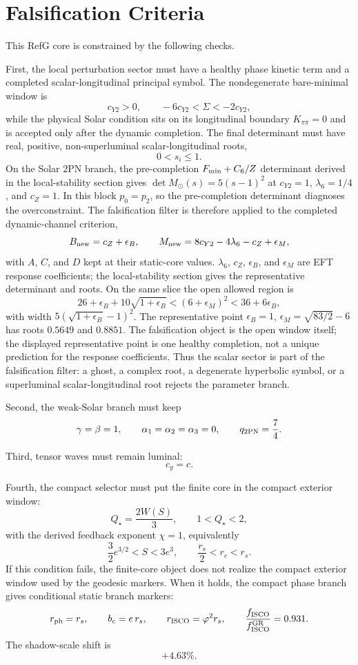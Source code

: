 \documentclass[12pt,a4paper]{article}
\begin{document}
\section{Falsification Criteria}

This RefG core is constrained by the following checks.

First, the local perturbation sector must have a healthy phase kinetic term and
a completed scalar-longitudinal principal symbol. The nondegenerate
bare-minimal window is
\[
c_{Y2}>0,\qquad -6c_{Y2}<\Sigma<-2c_{Y2},
\]
while the physical Solar condition sits on its longitudinal boundary
$K_{\pi\pi}=0$ and is accepted only after the dynamic completion. The final
determinant must have real, positive, non-superluminal scalar-longitudinal
roots,
\[
0<s_i\le 1.
\]
On the Solar $2$PN branch, the pre-completion $F_{\rm min}+C_6/Z$ determinant
derived in the local-stability section gives
$\det M_\odot(s)=5(s-1)^2$ at
$c_{Y2}=1$, $\lambda_6=1/4$, and $c_Z=1$. In this block $p_0=p_2$, so the
pre-completion determinant diagnoses the overconstraint.
The falsification filter is
therefore applied to the completed dynamic-channel criterion,
\[
B_{\rm new}=c_Z+\epsilon_B,\qquad
M_{\rm new}=8c_{Y2}-4\lambda_6-c_Z+\epsilon_M,
\]
with $A$, $C$, and $D$ kept at their static-core values.
$\lambda_6$, $c_Z$, $\epsilon_B$, and $\epsilon_M$ are EFT response
coefficients; the local-stability section gives the representative determinant
and roots.  On the same slice the open allowed region is
\[
26+\epsilon_B+10\sqrt{1+\epsilon_B}<(6+\epsilon_M)^2<36+6\epsilon_B,
\]
with width $5(\sqrt{1+\epsilon_B}-1)^2$.  The representative point
$\epsilon_B=1$, $\epsilon_M=\sqrt{83/2}-6$ has roots $0.5649$ and $0.8851$.
The falsification object is the open window itself; the displayed
representative point is one healthy completion, not a unique prediction for the
response coefficients.
Thus the scalar sector is part of the
falsification filter: a ghost, a complex root, a degenerate hyperbolic symbol,
or a superluminal scalar-longitudinal root rejects the parameter branch.

Second, the weak-Solar branch must keep
\[
\gamma=\beta=1,\qquad
\alpha_1=\alpha_2=\alpha_3=0,
\qquad
q_{2{\rm PN}}=\frac74.
\]

Third, tensor waves must remain luminal:
\[
c_g=c.
\]

Fourth, the compact selector must put the finite core in the compact exterior
window:
\[
Q_\star=\frac{2W(S)}{3},\qquad
1<Q_\star<2,
\]
with the derived feedback exponent $\chi=1$, equivalently
\[
\frac32 e^{3/2}<S<3e^{3},\qquad
\frac{r_s}{2}<r_c<r_s.
\]
If this condition fails, the finite-core object does not realize the compact
exterior window used by the geodesic markers. When it holds, the compact phase
branch gives conditional static branch markers:
\[
r_{\rm ph}=r_s,\qquad
b_c=e\,r_s,\qquad
r_{\rm ISCO}=\varphi^2r_s,\qquad
\frac{f_{\rm ISCO}}{f_{\rm ISCO}^{\rm GR}}=0.931.
\]
The shadow-scale shift is
\[
+4.63\%.
\]
\end{document}
